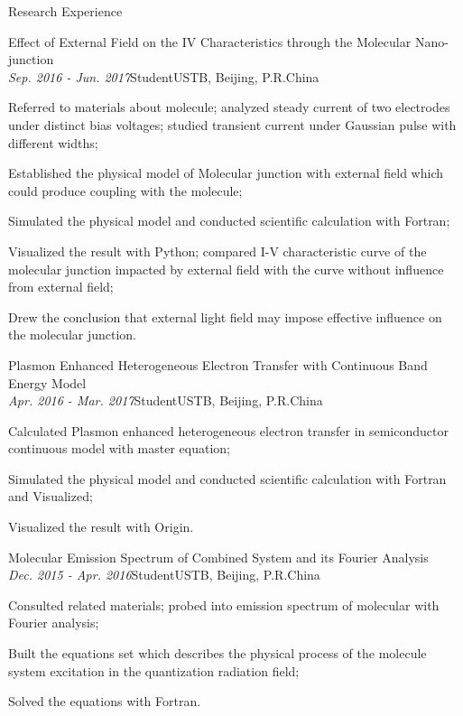 \documentclass[UTF8]{resume}    %
\begin{document}

\begin{rSection}{Research Experience}
    
    \begin{rSubsection}{Effect of External Field on the IV Characteristics through the Molecular Nano-junction\\}{\em Sep. 2016 - Jun. 2017}{Student}{USTB, Beijing, P.R.China}
    \item Referred to materials about molecule; analyzed steady current of two electrodes under distinct bias voltages; studied transient current under Gaussian pulse with different widths;
    \item Established the physical model of Molecular junction with external field which could produce coupling with the molecule;
    \item Simulated the physical model and conducted scientific calculation with Fortran;
    \item Visualized the result with Python; compared I-V characteristic curve of the molecular junction impacted by external field with the curve without influence from external field; 
    \item Drew the conclusion that external light field may impose effective influence on the molecular junction.
    \end{rSubsection}
        
    \begin{rSubsection}{Plasmon Enhanced Heterogeneous Electron Transfer with Continuous Band Energy Model\\}{\em Apr. 2016 - Mar. 2017}{Student}{USTB, Beijing, P.R.China}
    \item Calculated Plasmon enhanced heterogeneous electron transfer in semiconductor continuous model with master equation;
    \item Simulated the physical model and conducted scientific calculation with Fortran and Visualized;
    \item Visualized the result with Origin.
    \end{rSubsection}
        
    \begin{rSubsection}{Molecular Emission Spectrum of Combined System and its Fourier Analysis\\}{\em Dec. 2015 - Apr. 2016}{Student}{USTB, Beijing, P.R.China}
    \item Consulted related materials; probed into emission spectrum of molecular with Fourier analysis;
    \item Built the equations set which describes the physical process of the molecule system excitation in the quantization radiation field;
    \item Solved the equations with Fortran.
    \end{rSubsection}
       
    \end{rSection}
    
\end{document}

